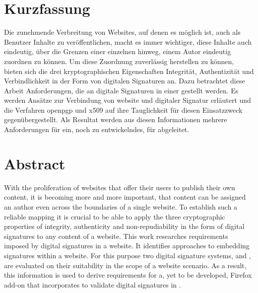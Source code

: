 

\noindent
\begin{minipage}{\textwidth}
\chapter*{Kurzfassung}
Die zunehmende Verbreitung von Websites, auf denen es möglich ist, auch als Benutzer Inhalte zu veröffentlichen, macht es immer wichtiger, diese Inhalte auch
eindeutig, über die Grenzen einer einzelnen  hinweg, einem Autor eindeutig zuordnen zu können. Um diese Zuordnung zuverlässig herstellen zu
können, bieten sich die drei kryptographischen Eigenschaften Integrität, Authentizität und Verbindlichkeit in der Form von digitalen Signaturen an. Dazu
betrachtet diese Arbeit Anforderungen, die an digitale Signaturen in einer  gestellt werden. Es werden Ansätze zur Verbindung von
\gls{website} und digitaler Signatur erläutert und die Verfahren \gls{openpgp} und \gls{x509} auf ihre Tauglichkeit für diesen Einsatzzweck gegenübergestellt.
Als Resultat werden aus diesen Informationen mehrere Anforderungen für ein, noch zu entwickelndes,  für  abgeleitet.

\chapter*{Abstract}
With the proliferation of websites that offer their users to publish their own content, it is becoming more and more important, that content can be assigned an
author even across the boundaries of a single website. To establish such a reliable mapping it is crucial to be able to apply the three cryptographic
properties of integrity, authenticity and non-repudiability in the form of digital signatures to any content of a website. This work researches requirements
imposed by digital signatures in a website. It identifies approaches to embedding signatures within a website. For this purpose two digital signature systems,
 and , are evaluated on their suitability in the scope of a website scenario. As a result, this information is used to derive
requirements for a, yet to be developed, Firefox add-on that incorporates  to validate digital signatures in .

\end{minipage}
